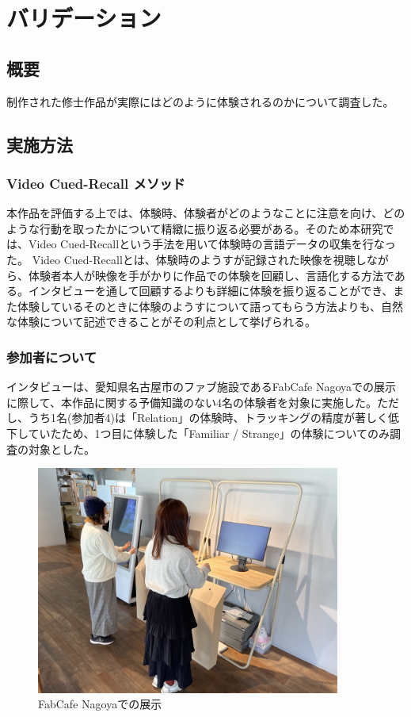 \chapter{バリデーション}
\label{validation}
\section{概要}
制作された修士作品が実際にはどのように体験されるのかについて調査した。

\section{実施方法}
\subsection{Video Cued-Recall メソッド}
本作品を評価する上では、体験時、体験者がどのようなことに注意を向け、どのような行動を取ったかについて精緻に振り返る必要がある。そのため本研究では、Video Cued-Recallという手法を用いて体験時の言語データの収集を行なった。 Video Cued-Recallとは、体験時のようすが記録された映像を視聴しながら、体験者本人が映像を手がかりに作品での体験を回顧し、言語化する方法である\cite{Costello2005}。インタビューを通して回顧するよりも詳細に体験を振り返ることができ、また体験しているそのときに体験のようすについて語ってもらう方法よりも、自然な体験について記述できることがその利点として挙げられる。

\subsection{参加者について}
インタビューは、愛知県名古屋市のファブ施設であるFabCafe Nagoyaでの展示に際して、本作品に関する予備知識のない4名の体験者を対象に実施した。ただし、うち1名(参加者4)は「Relation」の体験時、トラッキングの精度が著しく低下していたため、1つ目に体験した「Familiar / Strange」の体験についてのみ調査の対象とした。

\begin{figure}[H]
  \centering
  \includegraphics[width=10cm]{img/exhibit_at_fabcafe.jpeg}
  \caption{FabCafe Nagoyaでの展示}
  \label{fig:exhibit_at_fabcafe}
\end{figure}

